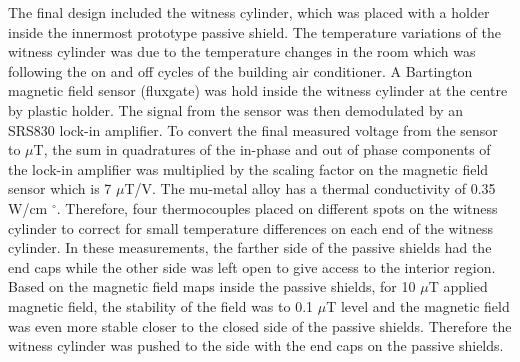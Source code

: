 \documentclass[review]{elsarticle}
\begin{document}
The final design included the witness cylinder, which was placed with a holder inside the innermost prototype passive shield. The temperature variations of the witness cylinder was due to the temperature changes in the room which was following the on and off cycles of the building air conditioner. A Bartington magnetic field sensor (fluxgate) was hold inside the witness cylinder at the centre by plastic holder. The signal from the sensor was then demodulated by an SRS830 lock-in amplifier. To convert the final measured voltage from the sensor to $\mu$T, the sum in quadratures of the in-phase and out of phase components of the lock-in amplifier was multiplied by the scaling factor on the magnetic field sensor which is 7 $\mu$T/V.  
The mu-metal alloy has a thermal conductivity of 0.35 W/cm $^{\circ}$. Therefore, four thermocouples placed on different spots on the witness cylinder to correct for small temperature differences on each end of the witness cylinder.
In these measurements, the farther side of the passive shields had the end caps while the other side was left open to give access to the interior region. Based on the magnetic field maps inside the passive shields, for 10 $\mu$T applied magnetic field, the stability of the field was to 0.1 $\mu$T level and the magnetic field was even more stable closer to the closed side of the passive shields. Therefore the witness cylinder was pushed to the side with the end caps on the passive shields. 




%
\end{document}
